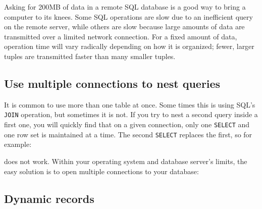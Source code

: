 Asking for 200MB of data in a remote SQL database is a good way to
bring a computer to its knees. Some SQL operations are slow due to an
inefficient query on the remote server, while others are slow because
large amounts of data are transmitted over a limited network
connection. For a fixed amount of data, operation time will vary
radically depending on how it is organized; fewer, larger tuples are
transmitted faster than many smaller tuples.

\subsection*{Use multiple connections to nest queries}

It is common to use more than one table at once. Some times this is
using SQL's \texttt{JOIN} operation, but sometimes it
is not. If you try to nest a second query inside a first one, you will
quickly find that on a given connection, only one \texttt{SELECT} and
one row set is maintained at a time. The second \texttt{SELECT}
replaces the first, so for example:


\noindent
does not work. Within your operating system and database
server's limits, the easy solution is to open multiple
connections to your database:


\subsection*{Dynamic records}

